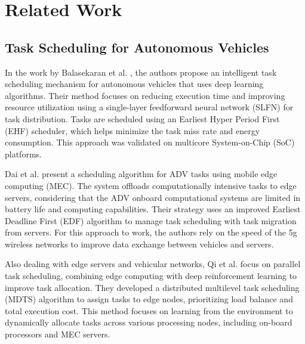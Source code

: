 \documentclass[conference]{IEEEtran}
\begin{document}
\section{Related Work}

\subsection{Task Scheduling for Autonomous Vehicles}


In the work by Balasekaran et al. \cite{Balasekaran2021}, the authors propose an intelligent task scheduling mechanism for autonomous vehicles that uses deep learning algorithms. Their method focuses on reducing execution time and improving resource utilization using a single-layer feedforward neural network (SLFN) for task distribution. Tasks are scheduled using an Earliest Hyper Period First (EHF) scheduler, which helps minimize the task miss rate and energy consumption. This approach was validated on multicore System-on-Chip (SoC) platforms.

Dai et al. \cite{Dai2019} present a scheduling algorithm for ADV tasks using mobile edge computing (MEC). The system offloads computationally intensive tasks to edge servers, considering that the ADV onboard computational systems are limited in battery life and computing capabilities. Their strategy uses an improved Earliest Deadline First (EDF) algorithm to manage task scheduling with task migration from servers. For this approach to work, the authors rely on the speed of the 5g wireless networks to improve data exchange between vehicles and servers.

Also dealing with edge servers and vehicular networks, Qi et al. \cite{qi2020} focus on parallel task scheduling, combining edge computing with deep reinforcement learning to improve task allocation. They developed a distributed multilevel task scheduling (MDTS) algorithm to assign tasks to edge nodes, prioritizing load balance and total execution cost. This method focuses on learning from the environment to dynamically allocate tasks across various processing nodes, including on-board processors and MEC servers.
\end{document}
